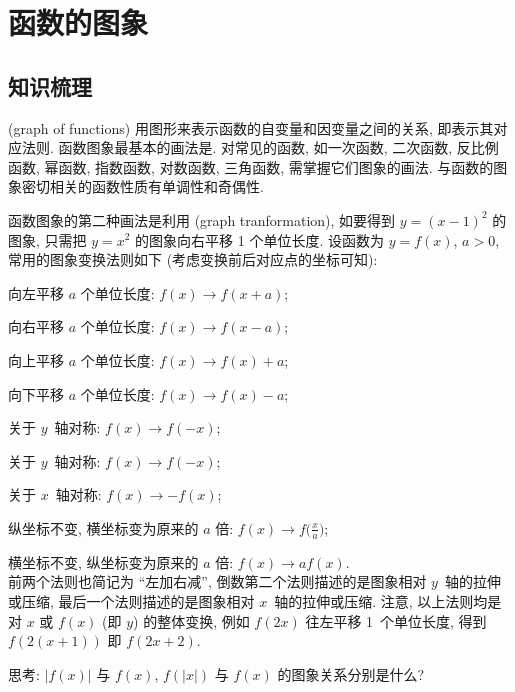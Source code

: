 
  \section{函数的图象}

  \subsection{知识梳理}
   (graph of functions) 用图形来表示函数的自变量和因变量之间的关系, 即表示其对应法则.
  函数图象最基本的画法是.
  对常见的函数, 如一次函数, 二次函数, 反比例函数, 幂函数, 指数函数, 对数函数, 三角函数, 需掌握它们图象的画法. 与函数的图象密切相关的函数性质有单调性和奇偶性.
  
  函数图象的第二种画法是利用 (graph tranformation), 如要得到 $y=(x-1)^2$ 的图象, 
  只需把 $y=x^2$ 的图象向右平移 1 个单位长度. 设函数为 $y=f(x)$, $a>0$,
  常用的图象变换法则如下 (考虑变换前后对应点的坐标可知):
  
  向左平移 $a$ 个单位长度: $f(x)\rightarrow f(x+a)$;
  
  向右平移 $a$ 个单位长度: $f(x)\rightarrow f(x-a)$;
  
  向上平移 $a$ 个单位长度: $f(x)\rightarrow f(x)+a$;
  
  向下平移 $a$ 个单位长度: $f(x)\rightarrow f(x)-a$;
  
  关于 $y$~轴对称: $f(x)\rightarrow f(-x)$;
    
  关于 $y$~轴对称: $f(x)\rightarrow f(-x)$;
  
  关于 $x$~轴对称: $f(x)\rightarrow -f(x)$;
  
  纵坐标不变, 横坐标变为原来的 $a$ 倍: $f(x)\rightarrow f\Big(\frac{x}a\Big)$;
  
  横坐标不变, 纵坐标变为原来的 $a$ 倍: $f(x)\rightarrow af(x)$.\\
  前两个法则也简记为 ``左加右减'', 倒数第二个法则描述的是图象相对 $y$~轴的拉伸或压缩,
  最后一个法则描述的是图象相对 $x$~轴的拉伸或压缩. 
  注意, 以上法则均是对 $x$ 或 $f(x)$ (即 $y$) 的整体变换, 
  例如 $f(2x)$ 往左平移 1~个单位长度, 得到 $f(2(x+1))$ 即 $f(2x+2)$.
  
  思考: $|f(x)|$ 与 $f(x)$, $f(|x|)$ 与 $f(x)$ 的图象关系分别是什么?
  
